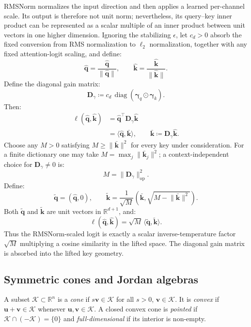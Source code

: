 \documentclass{article}
\newcommand{\1}{\bm{1}}
\newcommand{\defeq}{\coloneqq}
\newcommand{\norm}[1]{\lVert {#1} \rVert}
\newcommand{\lrangle}[1]{\langle#1\rangle}
\def\vk{{\bm{k}}}
\def\vq{{\bm{q}}}
\def\vu{{\bm{u}}}
\def\vv{{\bm{v}}}
\def\vgamma{{\bm{\gamma}}}
\def\hvq{\hat{\bm{\vq}}}
\def\hvk{\hat{\bm{\vk}}}
\def\mD{{\bm{D}}}
\def\gK{{\mathcal{K}}}
\newcommand{\R}{\mathbb{R}}
\theoremstyle{definition}
\begin{document}
RMSNorm normalizes the input direction and then applies a learned per-channel scale. Its output is
therefore not unit norm; nevertheless, its query--key inner product can be represented as a scalar
multiple of an inner product between unit vectors in one higher dimension. Ignoring the stabilizing
$\epsilon$, let $c_d>0$ absorb the fixed conversion from RMS normalization to $\ell_2$
normalization, together with any fixed attention-logit scaling, and define:
\[
  \widehat{\vq}=\frac{\hvq}{\norm{\hvq}},
  \qquad
  \widehat{\vk}=\frac{\hvk}{\norm{\hvk}}.
\]
Define the diagonal gain matrix:
\[
  \mD_\gamma
  \defeq
  c_d\,\operatorname{diag}(\vgamma_q\odot\vgamma_k).
\]
Then:
\begin{align}
  \ell(\hvq,\hvk)
    &=
    \widehat{\vq}^{\top}\mD_\gamma\widehat{\vk} \\
    &=
    \lrangle{\widehat{\vq},\bar{\vk}},
  \qquad
  \bar{\vk}
    \defeq
    \mD_\gamma\widehat{\vk}.
  \label{eq:rms-fused-key}
\end{align}
Choose any $M>0$ satisfying $M\ge\norm{\bar{\vk}}^2$ for every key under consideration. For a
finite dictionary one may take $M=\max_j\norm{\bar{\vk}_j}^2$; a context-independent choice for $\mD_\gamma\neq0$ is:
\[
  M=\norm{\mD_\gamma}_{\mathrm{op}}^2.
\]
Define:
\[
  \widetilde{\vq}=(\widehat{\vq},0),
  \qquad
  \widetilde{\vk}
    =
    \frac{1}{\sqrt M}
    \left(\bar{\vk},\sqrt{M-\norm{\bar{\vk}}^2}\right).
\]
Both $\widetilde{\vq}$ and $\widetilde{\vk}$ are unit vectors in $\R^{d+1}$, and:
\begin{equation}
  \ell(\hvq,\hvk)
  =
  \sqrt M\,
  \lrangle{\widetilde{\vq},\widetilde{\vk}}.
  \label{eq:rms-temperature-lift}
\end{equation}
Thus the RMSNorm-scaled logit is exactly a scalar inverse-temperature factor $\sqrt M$ multiplying
a cosine similarity in the lifted space. The diagonal gain matrix is absorbed into the lifted key geometry.




\subsection{Symmetric cones and Jordan algebras}
\label{app:cones}

A subset $\gK\subset\R^n$ is a \emph{cone} if $s\vv\in\gK$ for all $s>0$, $\vv\in\gK$. It is
\emph{convex} if $\vu+\vv\in\gK$ whenever $\vu,\vv\in\gK$. A closed convex cone is \emph{pointed}
if $\gK\cap(-\gK)=\{0\}$ and \emph{full-dimensional} if its interior is non-empty.
\end{document}
